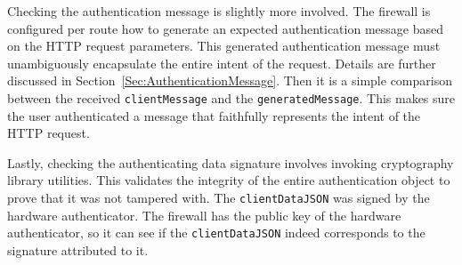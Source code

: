 Checking the authentication message is slightly more involved. The firewall is configured per route how to generate an expected authentication message based on the HTTP request parameters. This generated authentication message must unambiguously encapsulate the entire intent of the request. Details are further discussed in Section~\ref{Sec:AuthenticationMessage}. Then it is a simple comparison between the received \lstinline{clientMessage} and the \lstinline{generatedMessage}. This makes sure the user authenticated a message that faithfully represents the intent of the HTTP request.


Lastly, checking the authenticating data signature involves invoking cryptography library utilities. This validates the integrity of the entire authentication object to prove that it was not tampered with. The \lstinline{clientDataJSON} was signed by the hardware authenticator. The firewall has the public key of the hardware authenticator, so it can see if the \lstinline{clientDataJSON} indeed corresponds to the signature attributed to it.







